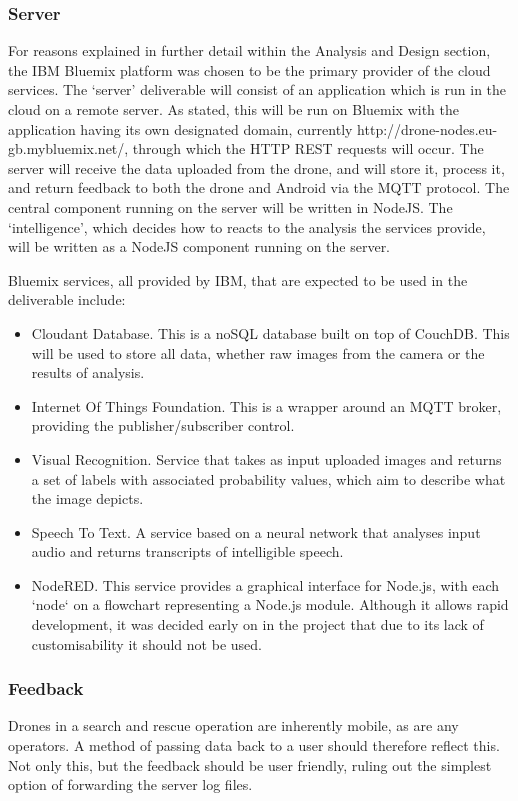 \documentclass{article}
\begin{document}
\subsubsection{Server}
For reasons explained in further detail within the Analysis and Design section, the IBM Bluemix platform was chosen to be the primary provider of the cloud services. The `server' deliverable will consist of an application which is run in the cloud on a remote server. As stated, this will be run on Bluemix with the application having its own designated domain, currently http://drone-nodes.eu-gb.mybluemix.net/, through which the HTTP REST requests will occur. The server will receive the data uploaded from the drone, and will store it, process it, and return feedback to both the drone and Android via the MQTT protocol. The central component running on the server will be written in NodeJS. The `intelligence', which decides how to reacts to the analysis the services provide, will be written as a NodeJS component running on the server.

Bluemix services, all provided by IBM, that are expected to be used in the deliverable include:
\begin{itemize}
    \item Cloudant Database. This is a noSQL database built on top of CouchDB. This will be used to store all data, whether raw images from the camera or the results of analysis.
    \item Internet Of Things Foundation. This is a wrapper around an MQTT broker, providing the publisher/subscriber control.
    \item Visual Recognition. Service that takes as input uploaded images and returns a set of labels with associated probability values, which aim to describe what the image depicts.
    \item Speech To Text. A service based on a neural network that analyses input audio and returns transcripts of intelligible speech.
    \item NodeRED. This service provides a graphical interface for Node.js, with each `node` on a flowchart representing a Node.js module. Although it allows rapid development, it was decided early on in the project that due to its lack of customisability it should not be used. 
\end{itemize}


\subsubsection{Feedback}\label{Feedback}
Drones in a search and rescue operation are inherently mobile, as are any operators. A method of passing data back to a user should therefore reflect this. Not only this, but the feedback should be user friendly, ruling out the simplest option of forwarding the server log files.
\end{document}
